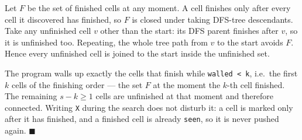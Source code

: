 \begin{invariantbox}
Let $F$ be the set of finished cells at any moment. A cell finishes only after every cell it discovered has finished, so $F$ is closed under taking DFS-tree descendants. Take any unfinished cell $v$ other than the start: its DFS parent finishes after $v$, so it is unfinished too. Repeating, the whole tree path from $v$ to the start avoids $F$. Hence every unfinished cell is joined to the start inside the unfinished set.

The program walls up exactly the cells that finish while \texttt{walled < k}, i.e.\ the first $k$ cells of the finishing order --- the set $F$ at the moment the $k$-th cell finished. The remaining $s-k \ge 1$ cells are unfinished at that moment and therefore connected. Writing \texttt{X} during the search does not disturb it: a cell is marked only after it has finished, and a finished cell is already \texttt{seen}, so it is never pushed again. \hfill$\blacksquare$
\end{invariantbox}

